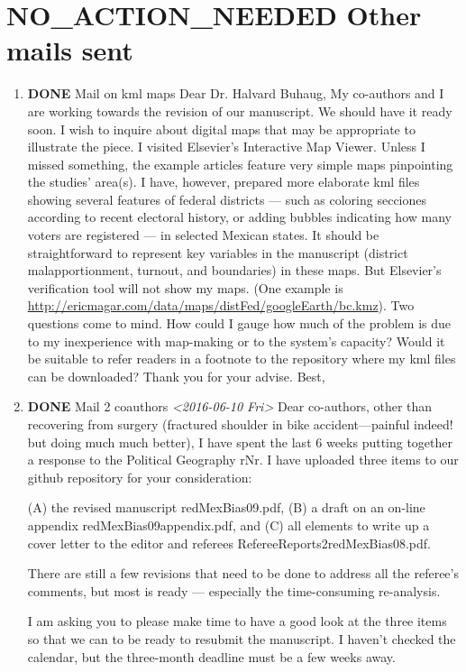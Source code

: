 \documentclass{article}
\begin{document}
\section{{\bfseries\sffamily NO\_ACTION\_NEEDED} Other mails sent}
\label{sec:orgheadline49}
\begin{enumerate}
\item {\bfseries\sffamily DONE} Mail on kml maps
\label{sec:orgheadline47}
Dear Dr. Halvard Buhaug, 
My co-authors and I are working towards the revision of our manuscript. We should have it ready soon. I wish to inquire about digital maps that may be appropriate to illustrate the piece. 
I visited Elsevier's Interactive Map Viewer. Unless I missed something, the example articles feature very simple maps pinpointing the studies' area(s). I have, however, prepared more elaborate kml files showing several features of federal districts --- such as coloring secciones according to recent electoral history, or adding bubbles indicating how many voters are registered --- in selected Mexican states. It should be straightforward to represent key variables in the manuscript (district malapportionment, turnout, and boundaries) in these maps. But Elsevier's verification tool will not show my maps. (One example is \url{http://ericmagar.com/data/maps/distFed/googleEarth/bc.kmz}).
Two questions come to mind. How could I gauge how much of the problem is due to my inexperience with map-making or to the system's capacity? Would it be suitable to refer readers in a footnote to the repository where my kml files can be downloaded?
Thank you for your advise.
Best,

\item {\bfseries\sffamily DONE} Mail 2 coauthors \textit{<2016-06-10 Fri>}
\label{sec:orgheadline48}
Dear co-authors, other than recovering from surgery (fractured shoulder in bike accident---painful indeed! but doing much much better), I have spent the last 6 weeks putting together a response to the Political Geography rNr. I have uploaded three items to our github repository for your consideration: 

(A) the revised manuscript redMexBias09.pdf, 
(B) a draft on an on-line appendix redMexBias09appendix.pdf, and 
(C) all elements to write up a cover letter to the editor and referees RefereeReports2redMexBias08.pdf.  

There are still a few revisions that need to be done to address all the referee's comments, but most is ready --- especially the time-consuming re-analysis. 

I am asking you to please make time to have a good look at the three items so that we can to be ready to resubmit the manuscript. I haven't checked the calendar, but the three-month deadline must be a few weeks away. 


\end{enumerate}
\end{document}
